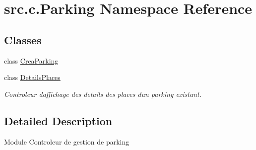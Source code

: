 \hypertarget{namespacesrc_1_1c_1_1_parking}{}\section{src.\+c.\+Parking Namespace Reference}
\label{namespacesrc_1_1c_1_1_parking}
\subsection*{Classes}
\begin{DoxyCompactItemize}
\item 
class \hyperlink{classsrc_1_1c_1_1_parking_1_1_crea_parking}{Crea\+Parking}
\item 
class \hyperlink{classsrc_1_1c_1_1_parking_1_1_details_places}{Details\+Places}
\begin{DoxyCompactList}\small\item\em Controleur d\textquotesingle{}affichage des details des places d\textquotesingle{}un parking existant. \end{DoxyCompactList}\end{DoxyCompactItemize}


\subsection{Detailed Description}
\begin{DoxyVerb}    Module Controleur de gestion de parking
\end{DoxyVerb}
 
